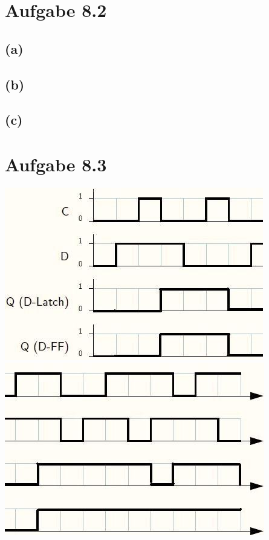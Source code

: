 \documentclass[12pt]{article}
\begin{document}
\section{Aufgabe 8.2}
\subsection{(a)}

\subsection{(b)}

\subsection{(c)}

\section{Aufgabe 8.3}
\includegraphics{Impulsdiagramm83a} \\
\includegraphics{Impulsdiagramm83b}
\end{document}
